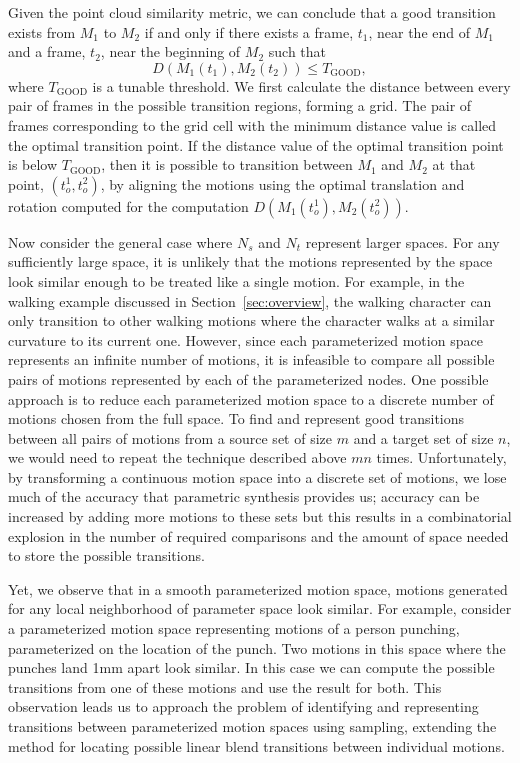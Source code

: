 \documentclass[10pt,twocolumn]{article}
\begin{document}
Given the point cloud similarity metric, we can conclude that a good transition exists from $M_1$ to $M_2$ if and only if there exists a frame, $t_1$, near the end of $M_1$ and a frame, $t_2$, near the beginning of $M_2$ such that
\[
D(M_1(t_1), M_2(t_2)) \leq T_{\mathrm{GOOD}},
\]
where $T_{\mathrm{GOOD}}$ is a tunable threshold. We first calculate the distance between every pair of frames in the possible transition regions, forming a grid. The pair of frames corresponding to the grid cell with the minimum distance value is called the optimal transition point. If the distance value of the optimal transition point is below $T_{\mathrm{GOOD}}$, then it is possible to transition between $M_1$ and $M_2$ at that point, $(t_o^1,t_o^2)$, by aligning the motions using the optimal translation and rotation computed for the computation $D(M_1(t_o^1),M_2(t_o^2))$.

Now consider the general case where $N_s$ and $N_t$ represent larger spaces. For any sufficiently large space, it is unlikely that the motions represented by the space look similar enough to be treated like a single motion. For example, in the walking example discussed in Section~\ref{sec:overview}, the walking character can only transition to other walking motions where the character walks at a similar curvature to its current one. However, since each parameterized motion space represents an infinite number of motions, it is infeasible to compare all possible pairs of motions represented by each of the parameterized nodes. One possible approach is to reduce each parameterized motion space to a discrete number of motions chosen from the full space. To find and represent good transitions between all pairs of motions from a source set of size $m$ and a target set of size $n$, we would need to repeat the technique described above $mn$ times. Unfortunately, by transforming a continuous motion space into a discrete set of motions, we lose much of the accuracy that parametric synthesis provides us; accuracy can be increased by adding more motions to these sets but this results in a combinatorial explosion in the number of required comparisons and the amount of space needed to store the possible transitions.

Yet, we observe that in a smooth parameterized motion space, motions generated for any local neighborhood of parameter space look similar. For example, consider a parameterized motion space representing motions of a person punching, parameterized on the location of the punch. Two motions in this space where the punches land 1mm apart look similar. In this case we can compute the possible transitions from one of these motions and use the result for both. This observation leads us to approach the problem of identifying and representing transitions between parameterized motion spaces using sampling, extending the method for locating possible linear blend transitions between individual motions.
\end{document}
